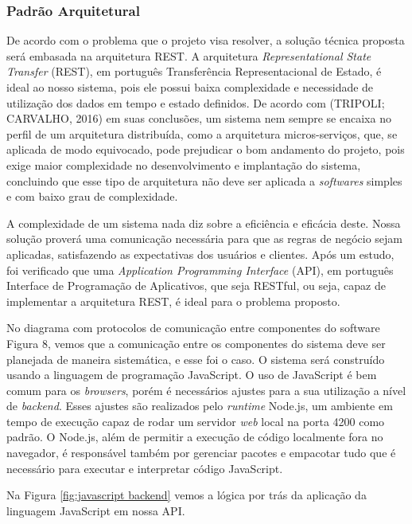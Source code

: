 
\subsubsection{Padrão Arquitetural}
De acordo com o problema que o projeto visa resolver, a solução técnica proposta será embasada na arquitetura REST. A arquitetura \textit{Representational State Transfer} (REST), em português Transferência Representacional de Estado, é ideal ao nosso sistema, pois ele possui baixa complexidade e necessidade de utilização dos dados em tempo e estado definidos. De acordo com (TRIPOLI; CARVALHO, 2016) em suas conclusões, um sistema nem sempre se encaixa no perfil de um arquitetura distribuída, como a arquitetura micros-serviços, que, se aplicada de modo equivocado, pode prejudicar o bom andamento do projeto, pois exige maior complexidade no desenvolvimento e implantação do sistema, concluindo que esse tipo de arquitetura não deve ser aplicada a \textit{softwares} simples e com baixo grau de complexidade. 

A complexidade de um sistema nada diz sobre a eficiência e eficácia deste. Nossa solução proverá uma comunicação necessária para que as regras de negócio sejam aplicadas, satisfazendo as expectativas dos usuários e clientes. Após um estudo, foi verificado que uma \textit{Application Programming Interface} (API), em português Interface de Programação de Aplicativos, que seja RESTful, ou seja, capaz de implementar a arquitetura REST, é ideal para o problema proposto. 

No diagrama com protocolos de comunicação entre componentes do software Figura 8, vemos que a comunicação entre os componentes do sistema deve ser planejada de maneira sistemática, e esse foi o caso. O sistema será construído usando a linguagem de programação JavaScript. O uso de JavaScript é bem comum para os \textit{browsers}, porém é necessários ajustes para a sua utilização a nível de \textit{backend}. Esses ajustes são realizados pelo \textit{runtime} Node.js, um ambiente em tempo de execução capaz de rodar um servidor \textit{web} local na porta 4200 como padrão. O Node.js, além de permitir a execução de código localmente fora no navegador, é responsável também por gerenciar pacotes e empacotar tudo que é necessário para executar e interpretar código JavaScript.

Na Figura \ref{fig:javascript backend} \cite{javascript-backend} vemos a lógica por trás da aplicação da linguagem JavaScript em nossa API.

